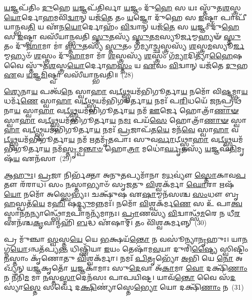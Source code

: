\-\ul{𑌯}\-𑌜𑍍𑌞𑌪᳴𑌤𑌿𑌂 \ul{𑌦𑍁}\-𑌹𑍇 \ul{𑌯}\-𑌜𑍍𑌞𑌪᳴𑌤𑌿𑌰𑍍𑌵𑌾 \ul{𑌯}\-𑌜𑍍𑌞𑌂 𑌦𑍁᳴\-\ul{𑌹𑍇} 𑌸 𑌯𑌃 𑌸𑍍𑌤𑍁᳴𑌤\-\ul{𑌶}\-𑌸𑍍𑌤𑍍𑌰\-\ul{𑌯𑍋}\-𑌰𑍍𑌦𑍋\-\ul{𑌹}\-𑌮𑌵𑌿᳴\-\ul{𑌦𑍍𑌵𑌾}\-𑌨𑍍 𑌯𑌜᳴\-\ul{𑌤𑍇} 𑌤𑌂 \ul{𑌯}\-𑌜𑍍𑌞𑍋 𑌦𑍁᳴𑌹𑍇 𑌸 \ul{𑌇}\-𑌷𑍍𑌟𑍍𑌵𑌾 𑌪𑌾𑌪𑍀᳴𑌯𑌾𑌨𑍍𑌭𑌵\-\ul{𑌤𑌿} 𑌯 𑌏᳴𑌨\-\ul{𑌯𑍋}\-𑌰𑍍𑌦𑍋𑌹𑌂᳴ \ul{𑌵𑌿}\-𑌦𑍍𑌵𑌾𑌨𑍍 𑌯𑌜᳴\-\ul{𑌤𑍇} 𑌸 \ul{𑌯}\-𑌜𑍍𑌞𑌂 𑌦𑍁᳴\-\ul{𑌹𑍇} 𑌸 \ul{𑌇}\-𑌷𑍍𑌟𑍍𑌵𑌾 𑌵𑌸𑍀᳴𑌯𑌾𑌨𑍍𑌭𑌵𑌤𑌿 \ul{𑌸𑍍𑌤𑍁}\-𑌤𑌸𑍍𑌯᳴ \ul{𑌸𑍍𑌤𑍁}\-𑌤\-\ul{𑌮}\-𑌸𑍍𑌯𑍂\-\ul{𑌰𑍍𑌜}\-𑌮𑍍𑌮𑌹𑍍𑌯𑍟᳴ \ul{𑌸𑍍𑌤𑍁}\-𑌤𑌂 𑌦𑍁᳴\-\ul{𑌹𑌾}\-𑌮𑌾 𑌮𑌾॑ \ul{𑌸𑍍𑌤𑍁}\-𑌤𑌸𑍍𑌯᳴ \ul{𑌸𑍍𑌤𑍁}\-𑌤𑌂 𑌗᳴𑌮𑍍𑌯𑌾\-\ul{𑌚𑍍𑌛}\-𑌸𑍍𑌤𑍍𑌰𑌸𑍍𑌯᳴ \ul{𑌶}\-𑌸𑍍𑌤𑍍𑌰\-\ul{𑌮}\-𑌸𑍍𑌯𑍂\-\ul{𑌰𑍍𑌜}\-𑌮𑍍𑌮𑌹𑍍𑌯𑍞᳴ \ul{𑌶}\-𑌸𑍍𑌤𑍍𑌰𑌂 𑌦𑍁᳴\-\ul{𑌹𑌾}\-𑌮𑌾 𑌮𑌾᳴ \ul{𑌶}\-𑌸𑍍𑌤𑍍𑌰𑌸𑍍𑌯᳴ \ul{𑌶}\-𑌸𑍍𑌤𑍍𑌰𑌂 𑌗᳴\-\ul{𑌮𑍍𑌯𑌾}\-𑌦𑌿𑌤𑍍𑌯𑌾᳴\-\ul{𑌹𑍈}\-𑌷 𑌵𑍈 𑌸𑍍𑌤𑍁᳴𑌤\-\ul{𑌶}\-𑌸𑍍𑌤𑍍𑌰\-\ul{𑌯𑍋}\-𑌰𑍍𑌦𑍋\-\ul{𑌹}\-\-\ul{𑌸𑍍𑌤𑌂} 𑌯 \ul{𑌏}\-𑌵𑌂 \ul{𑌵𑌿}\-𑌦𑍍𑌵𑌾𑌨𑍍 𑌯𑌜᳴𑌤𑍇 \ul{𑌦𑍁}\-𑌹 \ul{𑌏}\-𑌵 \ul{𑌯}\-𑌜𑍍𑌞\-\ul{𑌮𑌿}\-𑌷𑍍𑌟𑍍𑌵𑌾 𑌵𑌸𑍀᳴𑌯𑌾𑌨𑍍𑌭𑌵𑌤𑌿॥~(28)

{\anuvakamend[{\-\ul{𑌶}\-𑌸𑍍𑌤𑍍𑌰𑌂 𑌵𑍈 \ul{𑌶}\-𑌸𑍍𑌤𑍍𑌰𑌨𑍍𑌦𑍁᳴\-\ul{𑌹𑌾}\-𑌨𑍍𑌦𑍍𑌵𑌾𑌵𑌿𑍞᳴𑌶𑌤𑌿𑌶𑍍𑌚}]}%

\-\ul{𑌶𑍍𑌯𑍇}\-𑌨𑌾\-\ul{𑌯} 𑌪𑌤𑍍𑌵᳴\-\ul{𑌨𑍇} 𑌸𑍍𑌵𑌾\-\ul{𑌹𑌾} 𑌵\-\ul{𑌟𑍍𑌥𑍍𑌸𑍍𑌵}\-𑌯𑌮᳴𑌭𑌿𑌗𑍂𑌰𑍍𑌤𑌾\-\ul{𑌯} 𑌨𑌮𑍋᳴ 𑌵𑌿\-\ul{𑌷𑍍𑌟}\-𑌮𑍍𑌭𑌾\-\ul{𑌯} 𑌧𑌰𑍍𑌮᳴\-\ul{𑌣𑍇} 𑌸𑍍𑌵𑌾\-\ul{𑌹𑌾} 𑌵\-\ul{𑌟𑍍𑌥𑍍𑌸𑍍𑌵}\-𑌯𑌮᳴𑌭𑌿𑌗𑍂𑌰𑍍𑌤𑌾\-\ul{𑌯} 𑌨𑌮𑌃᳴ 𑌪\-\ul{𑌰𑌿}\-𑌧𑌯𑍇᳴ 𑌜\-\ul{𑌨}\-𑌪𑍍𑌰𑌥᳴𑌨𑌾\-\ul{𑌯} 𑌸𑍍𑌵𑌾\-\ul{𑌹𑌾} 𑌵\-\ul{𑌟𑍍𑌥𑍍𑌸𑍍𑌵}\-𑌯𑌮᳴𑌭𑌿𑌗𑍂𑌰𑍍𑌤𑌾\-\ul{𑌯} 𑌨𑌮᳴ \ul{𑌊}\-𑌰𑍍𑌜𑍇 𑌹𑍋𑌤𑍍𑌰𑌾᳴\-\ul{𑌣𑌾}\-\-\ul{𑍟} 𑌸𑍍𑌵𑌾\-\ul{𑌹𑌾} 𑌵\-\ul{𑌟𑍍𑌥𑍍𑌸𑍍𑌵}\-𑌯𑌮᳴𑌭𑌿𑌗𑍂𑌰𑍍𑌤𑌾\-\ul{𑌯} 𑌨\-\ul{𑌮𑌃} 𑌪𑌯᳴\-\ul{𑌸𑍇} 𑌹𑍋𑌤𑍍𑌰𑌾᳴\-\ul{𑌣𑌾}\-\-\ul{𑍟} 𑌸𑍍𑌵𑌾\-\ul{𑌹𑌾} 𑌵\-\ul{𑌟𑍍𑌥𑍍𑌸𑍍𑌵}\-𑌯𑌮᳴𑌭𑌿𑌗𑍂𑌰𑍍𑌤𑌾\-\ul{𑌯} 𑌨𑌮𑌃᳴ \ul{𑌪𑍍𑌰}\-𑌜𑌾𑌪᳴𑌤\-\ul{𑌯𑍇} 𑌮𑌨᳴\-\ul{𑌵𑍇} 𑌸𑍍𑌵𑌾\-\ul{𑌹𑌾} 𑌵\-\ul{𑌟𑍍𑌥𑍍𑌸𑍍𑌵}\-𑌯𑌮᳴𑌭𑌿𑌗𑍂𑌰𑍍𑌤𑌾\-\ul{𑌯} 𑌨𑌮᳴ \ul{𑌋}\-𑌤𑌮𑍃᳴𑌤𑌪𑌾𑌃 𑌸𑍁𑌵\-\ul{𑌰𑍍𑌵𑌾}\-𑌟𑍍𑌥𑍍𑌸𑍍𑌵𑌾\-\ul{𑌹𑌾} 𑌵\-\ul{𑌟𑍍𑌥𑍍𑌸𑍍𑌵}\-𑌯𑌮᳴𑌭𑌿𑌗𑍂𑌰𑍍𑌤𑌾\-\ul{𑌯} 𑌨𑌮᳴\-\ul{𑌸𑍍𑌤𑍃}\-𑌮𑍍𑌪\-\ul{𑌨𑍍𑌤𑌾}\-\-\ul{𑍞} 𑌹𑍋\-\ul{𑌤𑍍𑌰𑌾} 𑌮𑌧𑍋॑\-\ul{𑌰𑍍𑌘𑍃}\-𑌤𑌸𑍍𑌯᳴ \ul{𑌯}\-𑌜𑍍𑌞𑌪᳴\-\ul{𑌤𑌿}\-𑌮𑍃𑌷᳴\-\ul{𑌯} 𑌏𑌨᳴𑌸𑌾~(29)

\-\ul{𑌆}\-\-\ul{𑌹𑍁𑌃}\-। \ul{𑌪𑍍𑌰}\-𑌜𑌾 𑌨𑌿𑌰𑍍𑌭᳴𑌕𑍍𑌤𑌾 𑌅𑌨𑍁\-\ul{𑌤}\-𑌪𑍍𑌯𑌮𑌾᳴𑌨𑌾 𑌮\-\ul{𑌧}\-𑌵𑍍𑌯𑍗॑ \ul{𑌸𑍍𑌤𑍋}\-𑌕𑌾𑌵\-\ul{𑌪} 𑌤𑍗 𑌰᳴𑌰𑌾𑌧। 𑌸𑌂 \ul{𑌨}\-𑌸𑍍𑌤𑌾𑌭𑍍𑌯𑌾𑍞᳴ 𑌸𑍃𑌜𑌤𑍁 \ul{𑌵𑌿}\-𑌶𑍍𑌵𑌕᳴𑌰𑍍𑌮𑌾 \ul{𑌘𑍋}\-𑌰𑌾 𑌋𑌷᳴\-\ul{𑌯𑍋} 𑌨𑌮𑍋᳴ 𑌅𑌸𑍍𑌤𑍍𑌵𑍇𑌭𑍍𑌯𑌃। 𑌚𑌕𑍍𑌷𑍁᳴𑌷 𑌏\-\ul{𑌷𑌾}\-𑌮𑍍𑌮𑌨᳴𑌸𑌶𑍍𑌚 \ul{𑌸𑌂}\-𑌧𑍗 𑌬𑍃\-\ul{𑌹}\-𑌸𑍍𑌪𑌤᳴\-\ul{𑌯𑍇} 𑌮\-\ul{𑌹𑌿} 𑌷\-\ul{𑌦𑍍𑌦𑍍𑌯𑍁}\-𑌮𑌨𑍍𑌨𑌮𑌃᳴। 𑌨𑌮𑍋᳴ \ul{𑌵𑌿}\-𑌶𑍍𑌵𑌕᳴𑌰𑍍𑌮\-\ul{𑌣𑍇} 𑌸 𑌉᳴ 𑌪𑌾\-\ul{𑌤𑍍𑌵}\-𑌸𑍍𑌮𑌾𑌨᳴\-\ul{𑌨}\-𑌨𑍍𑌯𑌾𑌨𑍍𑌥𑍍𑌸𑍋᳴\-\ul{𑌮}\-𑌪𑌾𑌨𑍍𑌮𑌨𑍍𑌯᳴𑌮𑌾𑌨𑌃। \ul{𑌪𑍍𑌰𑌾}\-𑌣𑌸𑍍𑌯᳴ \ul{𑌵𑌿}\-𑌦𑍍𑌵𑌾𑌨𑍍𑌥𑍍𑌸᳴\-\ul{𑌮}\-𑌰𑍇 𑌨 𑌧𑍀\-\ul{𑌰} 𑌏𑌨᳴𑌶𑍍𑌚\-\ul{𑌕𑍃}\-𑌵𑌾𑌨𑍍𑌮𑌹𑌿᳴ \ul{𑌬}\-𑌦𑍍𑌧 𑌏᳴𑌷𑌾𑌮𑍍। 𑌤𑌂 𑌵𑌿᳴𑌶𑍍𑌵𑌕𑌰𑍍𑌮𑌨𑍍𑌨𑍍~(30)

𑌪𑍍𑌰 𑌮𑍁᳴𑌞𑍍𑌚𑌾 \ul{𑌸𑍍𑌵}\-𑌸𑍍𑌤\-\ul{𑌯𑍇} 𑌯𑍇 \ul{𑌭}\-𑌕𑍍𑌷𑌯᳴\-\ul{𑌨𑍍𑌤𑍋} 𑌨 𑌵𑌸𑍂॑𑌨𑍍𑌯𑌾\-\ul{𑌨𑍃}\-𑌹𑍁𑌃। 𑌯𑌾\-\ul{𑌨}\-𑌗𑍍𑌨\-\ul{𑌯𑍋}\-\-𑌽𑌨𑍍𑌵𑌤᳴𑌪𑍍𑌯\-\ul{𑌨𑍍𑌤} 𑌧𑌿𑌷𑍍𑌣𑌿᳴𑌯𑌾 \ul{𑌇}\-𑌯𑌂 𑌤𑍇𑌷𑌾᳴𑌮\-\ul{𑌵}\-𑌯𑌾 𑌦𑍁𑌰𑌿᳴\-\ul{𑌷𑍍𑌟𑍍𑌯𑍈} 𑌸𑍍𑌵𑌿𑌷𑍍𑌟𑌿𑌂 \ul{𑌨}\-𑌸𑍍𑌤𑌾𑌂 𑌕𑍃᳴𑌣𑍋𑌤𑍁 \ul{𑌵𑌿}\-𑌶𑍍𑌵𑌕᳴𑌰𑍍𑌮𑌾। 𑌨𑌮𑌃᳴ \ul{𑌪𑌿}\-𑌤𑍃𑌭𑍍𑌯𑍋᳴ \ul{𑌅}\-𑌭𑌿 𑌯𑍇 \ul{𑌨𑍋} 𑌅𑌖𑍍𑌯᳴𑌨𑍍 𑌯\-\ul{𑌜𑍍𑌞}\-𑌕𑍃𑌤𑍋᳴ \ul{𑌯}\-𑌜𑍍𑌞𑌕𑌾᳴𑌮𑌾𑌃 𑌸𑍁\-\ul{𑌦𑍇}\-𑌵𑌾 𑌅᳴\-\ul{𑌕𑌾}\-𑌮𑌾 \ul{𑌵𑍋} 𑌦𑌕𑍍𑌷𑌿᳴\-\ul{𑌣𑌾𑌂} 𑌨 𑌨𑍀᳴𑌨𑌿\-\ul{𑌮} 𑌮𑌾 \ul{𑌨}\-𑌸𑍍𑌤\-\ul{𑌸𑍍𑌮𑌾}\-𑌦𑍇𑌨᳴𑌸𑌃 𑌪𑌾𑌪𑌯𑌿𑌷𑍍𑌟। 𑌯𑌾𑌵᳴\-\ul{𑌨𑍍𑌤𑍋} 𑌵𑍈 𑌸᳴\-\ul{𑌦}\-𑌸𑍍𑌯𑌾॑\-\ul{𑌸𑍍𑌤𑍇} 𑌸𑌰𑍍𑌵𑍇᳴ 𑌦\-\ul{𑌕𑍍𑌷𑌿}\-𑌣𑍍𑌯𑌾॑𑌸𑍍𑌤𑍇\-\ul{𑌭𑍍𑌯𑍋} 𑌯𑍋 𑌦𑌕𑍍𑌷𑌿᳴\-\ul{𑌣𑌾𑌂} 𑌨~(31)

